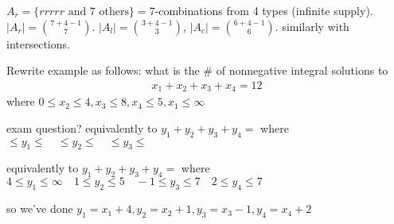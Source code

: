 \documentclass{article}
\begin{document}
$A_r=\{rrrrr\text{ and 7 others}\}=$7-combinations from 4 types (infinite supply). $\left\lvert A_r\right\rvert=\binom{7+4-1}{7}$. $\left\lvert A_l\right\rvert=\binom{3+4-1}{3}$, $\left\lvert A_c\right\rvert=\binom{6+4-1}{6}$. similarly with intersections.

Rewrite example as follows: what is the \# of nonnegative integral solutions to 
\begin{align*}
  x_1+x_2+x_3+x_4=12
\end{align*}
where $0\le x_2\le4,x_3\le8,x_4\le5,x_1\le\infty$

exam question?
equivalently to $y_1+y_2+y_3+y_4=$ where $\le y_1\le\quad \le y_2\le\quad\le y_3\le$

equivalently to $y_1+y_2+y_3+y_4=$ where $4\le y_1\le\infty\quad 1\le y_2\le5\quad-1\le y_3\le7\quad 2\le y_4\le7$

so we've done $y_1=x_1+4,y_2=x_2+1,y_3=x_3-1,y_4=x_4+2$
\end{document}

